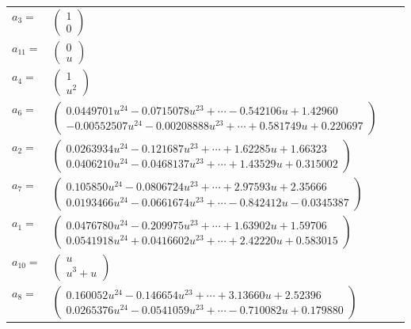 \documentclass[1p]{elsarticle_modified}
\theoremstyle{definition}
\begin{document}
\begin{tabular}{m{7pt} m{180pt} m{7pt} m{180pt} }
\flushright $a_{3}=$&$\begin{pmatrix}1\\0\end{pmatrix}$ \\
\flushright $a_{11}=$&$\begin{pmatrix}0\\u\end{pmatrix}$ \\
\flushright $a_{4}=$&$\begin{pmatrix}1\\u^2\end{pmatrix}$ \\
\flushright $a_{6}=$&$\begin{pmatrix}0.0449701 u^{24}-0.0715078 u^{23}+\cdots-0.542106 u+1.42960\\-0.00552507 u^{24}-0.00208888 u^{23}+\cdots+0.581749 u+0.220697\end{pmatrix}$ \\
\flushright $a_{2}=$&$\begin{pmatrix}0.0263934 u^{24}-0.121687 u^{23}+\cdots+1.62285 u+1.66323\\0.0406210 u^{24}-0.0468137 u^{23}+\cdots+1.43529 u+0.315002\end{pmatrix}$ \\
\flushright $a_{7}=$&$\begin{pmatrix}0.105850 u^{24}-0.0806724 u^{23}+\cdots+2.97593 u+2.35666\\0.0193466 u^{24}-0.0661674 u^{23}+\cdots-0.842412 u-0.0345387\end{pmatrix}$ \\
\flushright $a_{1}=$&$\begin{pmatrix}0.0476780 u^{24}-0.209975 u^{23}+\cdots+1.63902 u+1.59706\\0.0541918 u^{24}+0.0416602 u^{23}+\cdots+2.42220 u+0.583015\end{pmatrix}$ \\
\flushright $a_{10}=$&$\begin{pmatrix}u\\u^3+u\end{pmatrix}$ \\
\flushright $a_{8}=$&$\begin{pmatrix}0.160052 u^{24}-0.146654 u^{23}+\cdots+3.13660 u+2.52396\\0.0265376 u^{24}-0.0541059 u^{23}+\cdots-0.710082 u+0.179880\end{pmatrix}$ \\

\end{tabular}
\end{document}
